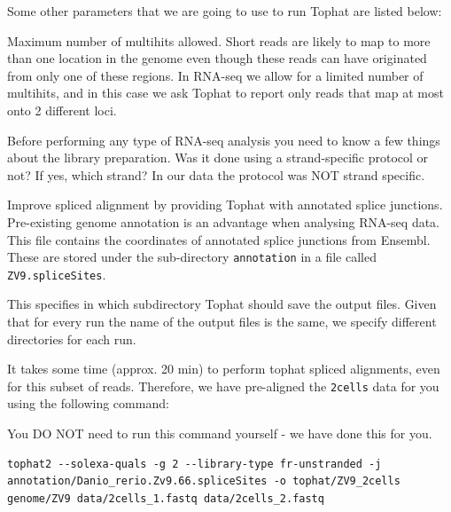 \begin{note}
Some other parameters that we are going to use to run Tophat are listed below:
\begin{description}[style=multiline,labelindent=0cm,align=right,leftmargin=\descriptionlabelspace,rightmargin=1.5cm,font=\ttfamily]
 \item[-g] Maximum number of multihits allowed. Short reads are likely to map to
 more than one location in the genome even though these reads can have originated
 from only one of these regions. In RNA-seq we allow for a limited number of
 multihits, and in this case we ask Tophat to report only reads that map at most
 onto 2 different loci.
 \item[--library-type] Before performing any type of RNA-seq analysis you need
 to know a few things about the library preparation. Was it done using a
 strand-specific protocol or not? If yes, which strand? In our data the protocol
 was NOT strand specific.
 \item[-j] Improve spliced alignment by providing Tophat with annotated splice
 junctions. Pre-existing genome annotation is an advantage when analysing RNA-seq
 data. This file contains the coordinates of annotated splice junctions from Ensembl.
 These are stored under the sub-directory \texttt{annotation} in a file called
 \texttt{ZV9.spliceSites}.
 \item[-o] This specifies in which subdirectory Tophat should save the output
 files. Given that for every run the name of the output files is the same, we
 specify different directories for each run.
\end{description}
\end{note}

It takes some time (approx. 20 min) to perform tophat spliced alignments, even for this subset of
reads. Therefore, we have pre-aligned the \texttt{2cells} data for you using the following command:
\begin{warning}
You DO NOT need to run this command yourself - we have done this for you.

\begin{lstlisting}
tophat2 --solexa-quals -g 2 --library-type fr-unstranded -j annotation/Danio_rerio.Zv9.66.spliceSites -o tophat/ZV9_2cells genome/ZV9 data/2cells_1.fastq data/2cells_2.fastq
\end{lstlisting}
\end{warning}

